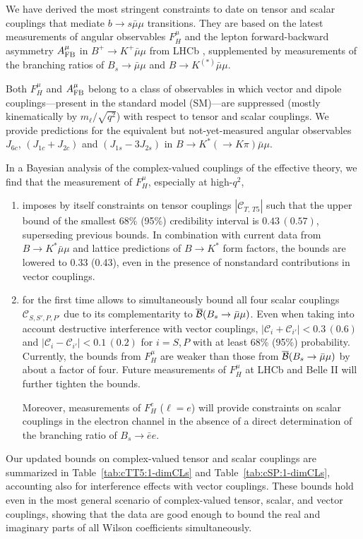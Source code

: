 \documentclass[twocolumn,epjc3]{svjour3}
\numberwithin{equation}{section}
\def \reftab#1{Table~\ref{#1}}
\newcommand{\wilson}[2][{}]{\mathcal{C}_{#2}^{\mathrm{#1}}}
\renewcommand{\[}{\big[}
\renewcommand{\]}{\big]}
\renewcommand{\(}{\big(}
\renewcommand{\)}{\big)}
\begin{document}
We have derived the most stringent constraints to date on tensor and scalar
couplings that mediate $b\to s\bar\mu\mu$ transitions{. They are based on}
the latest
measurements of angular observables $F_H^\mu$ and the lepton forward-backward
asymmetry $A_{\rm FB}^\mu$ in $B^+\to K^+ \bar\mu\mu$ from LHCb
\cite{Aaij:2014tfa}, supplemented by measurements of the branching ratios of
$B_s\to \bar\mu\mu$ and $B\to K^{(*)} \bar\mu\mu$.

Both $F_H^\mu$ and $A_{\rm FB}^\mu$ belong to a class of observables
in which vector and dipole couplings---present in the standard model
(SM)---are suppressed (mostly kinematically by $m_\ell / \sqrt{q^2}$)
with respect to tensor and scalar couplings. We provide predictions
for the equivalent but not-yet-measured angular observables $J_{6c}$,
$(J_{1c} + J_{2c})$ and $(J_{1s} - 3 J_{2s})$ in $B\to K^* (\to K\pi)
\bar\mu\mu$.

In a Bayesian analysis of the complex-valued couplings of the effective theory,
we find that the measurement of $F_H^\mu$, especially at high-$q^2$,
\begin{enumerate}
\item imposes by itself {constraints} on tensor couplings
  $|\wilson{T,\,T5}|$ such that the upper bound of the smallest 68\%
  (95\%) credibility interval is $0.43\, (0.57)$, superseding previous
  bounds.  In combination with current data from $B\to K^* \bar\mu\mu$
  and lattice {predictions of} $B\to K^*$ form factors, the
  bounds are lowered to 0.33 (0.43), even in the presence of
  nonstandard contributions in vector couplings.
  \item for the first time allows to {simultaneously} bound all four scalar couplings
  {$\wilson{S,S',P,P'}$} due to its complementarity to
  $\overline{\cal B}(B_s \to \bar\mu\mu)$. Even when taking into account
  destructive interference with vector couplings, $|\wilson{i} + \wilson{i'}| <
  0.3\, (0.6)$ and $|\wilson{i} - \wilson{i'}| < 0.1\, (0.2)$ for $i = S,P$ with
  at least 68\% (95\%) probability. Currently, the bounds from $F_H^\mu$ are
  weaker than those from $\overline{\cal B}(B_s \to \bar\mu\mu)$ by about a
  factor of four. Future measurements of $F_H^\mu$ at LHCb and Belle II will
  further tighten the bounds.

  Moreover, measurements of $F_H^e$ ($\ell = e$) will provide constraints on
  scalar couplings in the electron channel in the absence of a direct
  determination of the branching ratio of $B_s \to \bar{e}e$.
\end{enumerate}
Our updated bounds on complex-valued tensor and scalar couplings are summarized
in \reftab{tab:cTT5:1-dimCLs} and \reftab{tab:cSP:1-dimCLs}, accounting also for
interference effects with vector couplings. These bounds hold even in the most
general scenario of complex-valued tensor, scalar, and vector couplings, showing
that the data are good enough to bound the real and imaginary parts of all
Wilson coefficients simultaneously.
\end{document}
